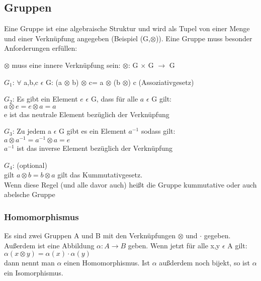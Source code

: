 \documentclass[a4paper,10pt]{scrartcl}
\begin{document}
        \subsection{Gruppen}
            Eine Gruppe ist eine algebraische Struktur und wird als Tupel von einer Menge und einer Verknüpfung angegeben (Beispiel (G,$\otimes$)). Eine Gruppe muss 
            besonder Anforderungen erfüllen: 
            \begin{description}
                \item $\otimes$ muss eine innere Verknüpfung sein: $\otimes$: G $\times$ G $\rightarrow$ G 
                \item $G_1$: $\forall$ a,b,c $\epsilon$ G: (a $\otimes$ b) $\otimes$ c= a $\otimes$ (b $\otimes$) c (Assoziativgesetz)
                \item $G_2$: Es gibt ein Element $e$ $\epsilon$ G, dass für alle $a$ $\epsilon$ G gilt:\\ $a \otimes e = e \otimes a = a$ \\ e ist das neutrale Element bezüglich der Verknüpfung
                \item $G_3$: Zu jedem a $\epsilon$ G gibt es ein Element $a^{-1}$ sodass gilt: \\ $a \otimes a^{-1} = a^{-1} \otimes a = e$ \\ $a^{-1}$ ist das inverse Element bezüglich der Verknüpfung
                \item $G_4$: (optional) \\ gilt $a \otimes b = b \otimes a$ gilt das Kummutativgesetz. \\Wenn diese Regel (und alle davor auch) heißt die Gruppe kummutative oder auch abelsche Gruppe
            \end{description}
            \subsubsection{Homomorphismus}
                Es sind zwei Gruppen A und B mit den Verknüpfungen $\otimes$ und $\cdot$ gegeben. \\
                Außerdem ist eine Abbildung $\alpha: A \rightarrow B$ geben. Wenn jetzt für alle x,y $\epsilon$ A gilt:\\
                $\alpha(x \otimes y) = \alpha(x) \cdot \alpha(y)$\\
                dann nennt man $\alpha$ einen Homomorphismus. Ist $\alpha$ außderdem noch bijekt, so ist $\alpha$ ein Isomorphismus.  
\end{document}
